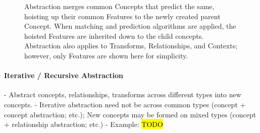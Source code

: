 \documentclass{article}
\begin{document}
\begin{figure}[ht]
{%
  }
  \caption{Abstraction merges common Concepts that predict the same, hoisting up their common Features to the newly created parent Concept. When matching and prediction algorithms are applied, the hoisted Features are inherited down to the child concepts. Abstraction also applies to Transforms, Relationships, and Contexts; however, only Features are shown here for simplicity.}
  \label{fig:abstraction}
\end{figure}

\paragraph{Iterative / Recursive Abstraction}
- Abstract concepts, relationships, transforms across different types into new concepts.
- Iterative abstraction need not be across common types (concept + concept abstraction; etc.); New concepts may be formed on mixed types (concept + relationship abstraction; etc.)
- Example: \hl{TODO}
\end{document}
